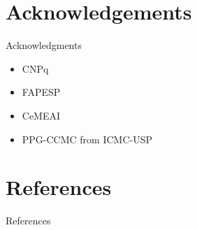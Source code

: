 \documentclass[12pt,portuguese]{beamer}
\begin{document}
\section*{Acknowledgements}
\begin{frame}{Acknowledgments}
\begin{itemize}
\item CNPq
	\vspace{1pt}
\item FAPESP
	\vspace{1pt}
\item CeMEAI
	\vspace{1pt}
\item PPG-CCMC from ICMC-USP
\end{itemize}
\end{frame}
%
%
%
%
%
%
%
%
%
%
%
%
%
%
\section*{References}
\begin{frame}[allowframebreaks]{References}
	\begingroup
	\footnotesize
	
	
	\endgroup
\end{frame}
\end{document}
